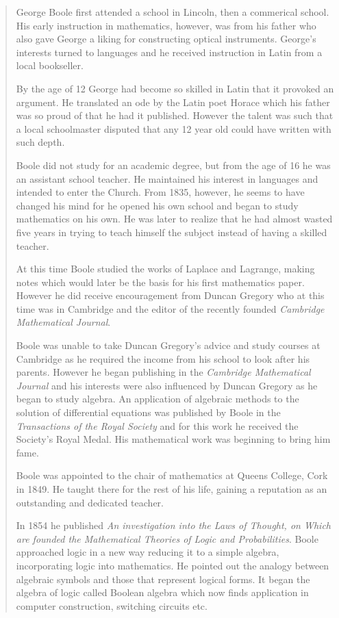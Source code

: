 \begin{quote}
George Boole first attended a school in Lincoln, then a commerical school.
His early instruction in mathematics, however, was from his father who
also gave George a liking for constructing optical instruments.  George's
interests turned to languages and he received instruction in Latin from a 
local bookseller.

By the age of 12 George had become so skilled in Latin that it provoked
an argument.  He translated an ode by the Latin poet Horace which his 
father was so proud of that he had it published.  However the talent was
such that a local schoolmaster disputed that any 12 year old could
have written with such depth.

Boole did not study for an academic degree, but from the age of 16 he was an 
assistant school teacher.  He maintained his interest in languages
and intended to enter the Church.  From 1835, however, he seems to have
changed his mind for he opened his own school and began to study mathematics
on his own.  He was later to realize that he had almost wasted five years
in trying to teach himself the subject instead of having a skilled teacher.

At this time Boole studied the works of Laplace and Lagrange, making 
notes which would later be the basis for his first mathematics paper.
However he did receive encouragement from Duncan Gregory who at this 
time was in Cambridge and the editor of the recently founded
\emph{Cambridge Mathematical Journal}.

Boole was unable to take Duncan Gregory's advice and study courses at 
Cambridge as he required the income from his school to look after
his parents.  However he began publishing in the \emph{Cambridge 
Mathematical Journal} and his interests were also influenced by Duncan Gregory
as he began to study algebra. An application of algebraic methods 
to the solution of differential equations was published by Boole in the
\emph{Transactions of the Royal Society} and for this work he received 
the Society's Royal Medal.  His mathematical work was beginning to bring
him fame.

Boole was appointed to the chair of mathematics at Queens College, 
Cork in 1849. He taught there for the rest of his life, gaining a reputation
as an outstanding and dedicated teacher.

In 1854 he published \emph{An investigation into the Laws of Thought, on 
Which are founded the Mathematical Theories of Logic and Probabilities}.
Boole approached logic in a new way reducing it to a simple algebra, 
incorporating logic into mathematics.  He pointed out the analogy
between algebraic symbols and those that represent logical forms. 
It began the algebra of logic called Boolean algebra which now finds
application in computer construction, switching circuits etc.


\end{quote}
